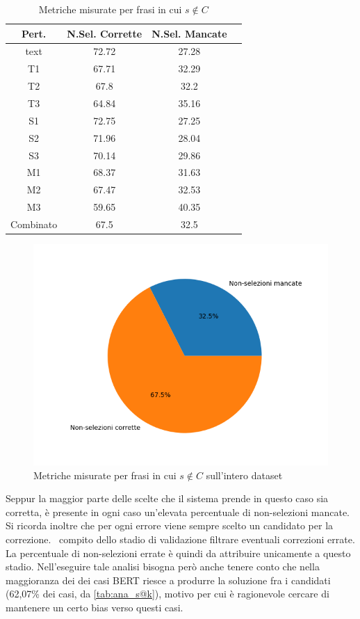 \begin{table}[H]
\centering
\begin{tabular}{cccc}
\textbf{Pert.} & \textbf{N.Sel. Corrette} & \textbf{N.Sel. Mancate} &\\
\hline
text& 72.72& 27.28\\
T1& 67.71& 32.29\\
T2& 67.8& 32.2\\
T3& 64.84& 35.16\\
S1& 72.75& 27.25\\
S2& 71.96& 28.04\\
S3& 70.14& 29.86\\
M1& 68.37& 31.63\\
M2& 67.47& 32.53\\
M3& 59.65& 40.35\\
Combinato& 67.5& 32.5\\
\end{tabular}
\caption{Metriche misurate per frasi in cui $s \not\in C$}
\label{tab:ana_metninc}
\end{table}

\begin{figure}[H]
\centering
\includegraphics[width=\textwidth]{immagini/analisi/non_correct_combinato}
\caption{Metriche misurate per frasi in cui $s \not\in C$ sull'intero dataset}
\label{fig:ana_pienon}
\end{figure}

Seppur la maggior parte delle scelte che il sistema prende in questo caso sia corretta, è presente in ogni caso un'elevata percentuale di non-selezioni mancate. Si ricorda inoltre che per ogni errore viene sempre scelto un candidato per la correzione. \E\ compito dello stadio di validazione filtrare eventuali correzioni errate. La percentuale di non-selezioni errate è quindi da attribuire unicamente a questo stadio. Nell'eseguire tale analisi bisogna però anche tenere conto che nella maggioranza dei dei casi BERT riesce a produrre la soluzione fra i candidati (62,07\% dei casi, da \autoref{tab:ana_s@k}), motivo per cui è ragionevole cercare di mantenere un certo bias verso questi casi.


